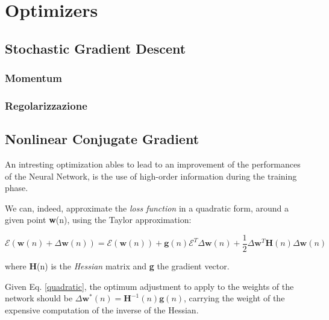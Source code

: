 \chapter{Optimizers} %
\label{cha:optimizers}
	\section{Stochastic Gradient Descent} %
	\label{sec:sgd}
	

		\subsection{Momentum} %
		\label{sec:momentum}
		

		\subsection{Regolarizzazione} %
		\label{sec:regolarizzazione}

	\section{Nonlinear Conjugate Gradient} %
	\label{sec:nonlinear_conjugate_gradient}
	
		An intresting optimization ables to lead to an improvement of the performances of the Neural Network, is the use of high-order information during the training phase.

		We can, indeed, approximate the \textit{loss function} in a quadratic form, around a given point \textbf{w}(n), using the Taylor approximation:

		 \begin{equation} 
		 	\label{quadratic}
		    \mathcal{E}(\textbf{w}(n) + \Delta\textbf{w}(n)) = \mathcal{E}(\textbf{w}(n))+\textbf{g}(n)\mathcal{E}^T\Delta\textbf{w}(n)+ \frac{1}{2}\Delta\textbf{w}^T\textbf{H}(n)\Delta\textbf{w}(n)
		 \end{equation} 

		where \textbf{H}(n) is the \textit{Hessian} matrix and \textbf{g} the gradient vector.

		Given Eq. \ref{quadratic}, the optimum adjustment to apply to the weights of the network should be $\Delta\textbf{w}^*(n) = \textbf{H}^{-1}(n)\textbf{g}(n)$, carrying the weight of the expensive computation of the inverse of the Hessian.

